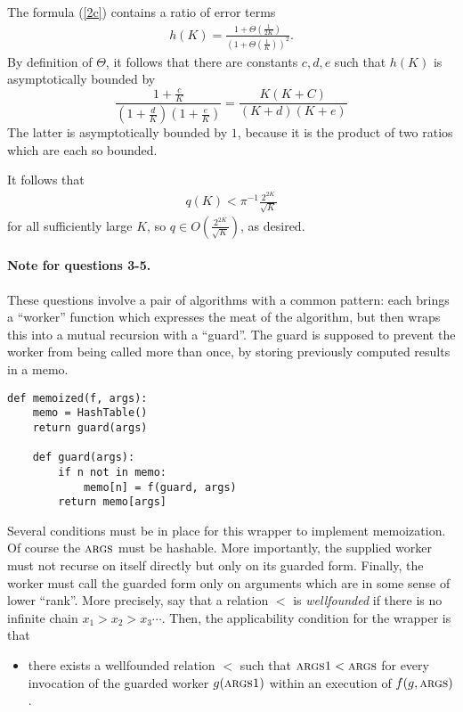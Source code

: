 \documentclass[
]{article}
\newcommand{\tsc}[1]{\ensuremath{\textsc{#1}}}
\begin{document}
The formula (\ref{2c}) contains a ratio of error terms 
\begin{align*}
h(K)
=
\frac
{1+\Theta(\frac{1}{2K})}
{(1+\Theta(\frac{1}{K}))^2}.
\end{align*}
By definition of $\Theta$, it follows that there are constants $c,d,e$ such that $h(K)$ is asymptotically bounded by
\begin{equation*}
\frac{1+\frac{c}{K}}{(1+\frac{d}{K})(1+\frac{e}{K})}
=
\frac{K(K+C)}{(K+d)(K+e)}
\end{equation*}
The latter is asymptotically bounded by $1$, because it is the product of two ratios which are each so bounded.

It follows that 
\begin{align*}
q(K) < \pi^{-1}\frac{2^{2K}}{\sqrt K}
\end{align*}
for all sufficiently large $K$, so $q\in O\left(\frac{2^{2K}}{\sqrt K}\right)$, as desired.

\paragraph{Note for questions 3-5.}  These questions involve a pair of algorithms with a common pattern: each brings a ``worker'' function which expresses the meat of the algorithm, but then wraps this into a mutual recursion with a ``guard''.  The guard is supposed to prevent the worker from being called more than once, by storing previously computed results in a memo.  
\begin{verbatim}
def memoized(f, args):
    memo = HashTable()
    return guard(args)

    def guard(args):
        if n not in memo:
            memo[n] = f(guard, args)
        return memo[args]
\end{verbatim}
Several conditions must be in place for this wrapper to implement memoization.  Of course the \tsc{args} must be hashable. More importantly, the supplied worker must not recurse on itself directly but only on its guarded form. Finally, the worker must call the guarded form only on arguments which are in some sense of lower ``rank''.  More precisely, say that a relation $<$ is \emph{wellfounded} if there is no infinite chain $x_1>x_2>x_3\cdots$.  Then, the applicability condition for the wrapper is that
\begin{itemize}
\item there exists a wellfounded relation $<$ such that $\tsc{args1} < \tsc{args}$ for every invocation of the guarded worker $g(\tsc{args1})$ within an execution of
$f(g, \tsc{args})$.
\end{itemize}
\end{document}
